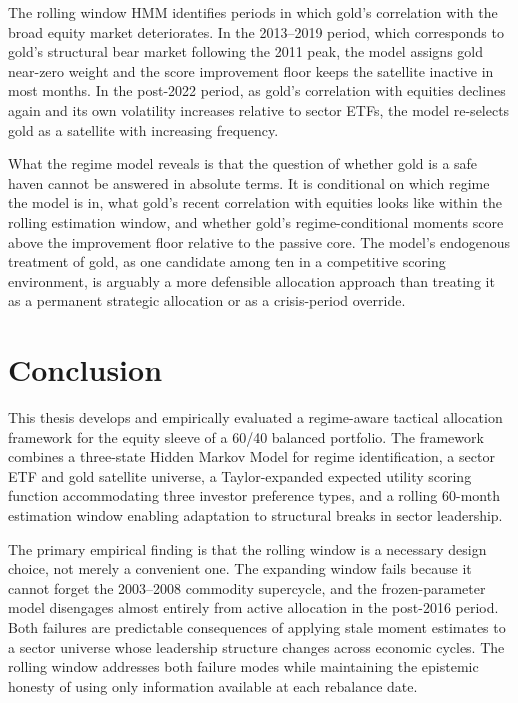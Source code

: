 \documentclass[12pt, a4paper]{article}
\begin{document}
The rolling window HMM identifies periods in which gold's correlation with the
broad equity market deteriorates. In the 2013--2019 period, which corresponds to gold's
structural bear market following the 2011 peak, the model assigns gold near-zero weight and
the score improvement floor keeps the satellite inactive in most months. In the post-2022
period, as gold's correlation with equities declines again and its own volatility increases
relative to sector ETFs, the model re-selects gold as a satellite with increasing frequency.

What the regime model reveals is that the question of whether gold is a safe haven cannot be
answered in absolute terms. It is conditional on which regime the model is in, what gold's
recent correlation with equities looks like within the rolling estimation window, and whether
gold's regime-conditional moments score above the improvement floor relative to the passive
core. The model's endogenous treatment of gold, as one candidate among ten in a competitive
scoring environment, is arguably a more defensible allocation approach than treating it as a
permanent strategic allocation or as a crisis-period override.

\clearpage
\clearpage
\section{Conclusion}
\label{sec:conclusion}

This thesis develops and empirically evaluated a regime-aware tactical allocation
framework for the equity sleeve of a 60/40 balanced portfolio. The framework combines a
three-state Hidden Markov Model for regime identification, a sector ETF and gold satellite
universe, a Taylor-expanded expected utility scoring function accommodating three investor
preference types, and a rolling 60-month estimation window enabling adaptation to structural
breaks in sector leadership.

The primary empirical finding is that the rolling window is a necessary design choice, not
merely a convenient one. The expanding window fails because it cannot forget the 2003--2008
commodity supercycle, and the frozen-parameter model disengages almost entirely from active
allocation in the post-2016 period. Both failures are predictable consequences of applying
stale moment estimates to a sector universe whose leadership structure changes across
economic cycles. The rolling window addresses both failure modes while maintaining the
epistemic honesty of using only information available at each rebalance date.
\end{document}
